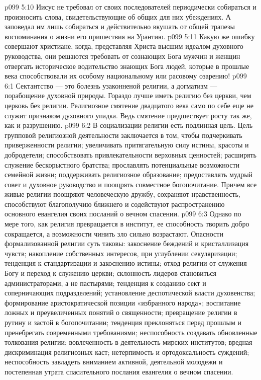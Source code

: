 \vs p099 5:10 Иисус не требовал от своих последователей периодически собираться и произносить слова, свидетельствующие об общих для них убеждениях. А заповедал им лишь собираться и действительно  вкушать от общей трапезы воспоминания о жизни его пришествия на Урантию.
\vs p099 5:11 \pc Какую же ошибку совершают христиане, когда, представляя Христа высшим идеалом духовного руководства, они решаются требовать от сознающих Бога мужчин и женщин отвергать историческое водительство знающих Бога людей, которые в прошлые века способствовали их особому национальному или расовому озарению!
\vs p099 6:1 Сектантство --- это болезнь узаконненой религии, а догматизм --- порабощение духовной природы. Гораздо лучше иметь религию без церкви, чем церковь без религии. Религиозное смятение двадцатого века само по себе еще не служит признаком духовного упадка. Ведь смятение предшествует росту так же, как и разрушению.
\vs p099 6:2 В социализации религии есть подлинная цель. Цель групповой религиозной деятельности заключается в том, чтобы подчеркивать приверженности религии; увеличивать притягательную силу истины, красоты и добродетели; способствовать привлекательности верховных ценностей; расширять служение бескорыстного братства; прославлять потенциальные возможности семейной жизни; поддерживать религиозное образование; предоставлять мудрый совет и духовное руководство и поощрять совместное богопочитание. Причем все живые религии поощряют человеческую дружбу, сохраняют нравственность, способствуют благополучию ближнего и содействуют распространению основного евангелия своих посланий о вечном спасении.
\vs p099 6:3 Однако по мере того, как религия превращается в институт, ее способность творить добро сокращается, а возможности чинить зло сильно возрастают. Опасности формализованной религии суть таковы: закоснение беждений и кристаллизация чувств; накопление собственных интересов, при углублении секуляризации; тенденция к стандартизации и закоснению истины; отход религии от служения Богу и переход к служению церкви; склонность лидеров становиться администраторами, а не пастырями; тенденция к созданию сект и соперничающих подразделений; установление деспотической власти духовенства; формирование аристократической позиции «избранного народа»; воспитание ложных и преувеличенных понятий о священности; превращение религии в рутину и застой в богопочитании; тенденция преклоняться перед прошлым и пренебрегать современными требованиями; неспособность создавать обновленные толкования религии; вовлеченность в деятельность мирских институтов; вредная дискриминация религиозных каст; нетерпимость и ортодоксальность суждений; неспособность завладеть вниманием активной, деятельной молодежи и постепенная утрата спасительного послания евангелия о вечном спасении.
